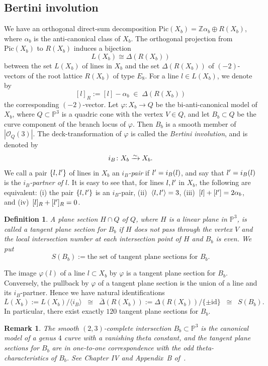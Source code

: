 \documentclass{math}
\theoremstyle{plain}
\newtheorem{definition}[theorem]{Definition}
\newtheorem{remark}[theorem]{Remark}
\numberwithin{equation}{section}
\newcommand{\PP}{\mathord{\mathbb  P}}
\newcommand{\ZZ}{\mathord{\mathbb Z}}
\newcommand{\OOO}{\mathord{\mathcal O}}
\newcommand{\isom}{\xrightarrow{\raise -3pt \hbox{\scriptsize $\sim$} }}
\newcommand{\angs}[1]{\langle {#1}  \rangle}
\newcommand{\sprime}{\sp{\prime}}
\newcommand{\id}{\mathord{\mathrm{id}}}
\newcommand{\intf}[1]{\langle #1 \rangle}
\newcommand{\Pic}{\mathrm{Pic}}
\newcommand{\barDelta}{\overline{\Delta}}
\newcommand{\barL}{\overline{L}}
\newcommand{\involB}{i_B}
\begin{document}
\subsection{Bertini involution}\label{subsec:Bertini}
%
We have an orthogonal direct-sum decomposition 
$\Pic(X_b)=\ZZ \alpha_b \oplus R(X_b)$,
where $\alpha_b$ is the anti-canonical class of $X_b$.
The orthogonal projection from $\Pic(X_b)$ to $R(X_b)$ induces a bijection 
%
\begin{equation}\label{eq:LX}
L(X_b)\cong  \Delta(R(X_b))
\end{equation}
%
between  the set $L(X_b)$ of lines in $X_b$ and  the set $\Delta(R(X_b))$
of $(-2)$-vectors of the root lattice $R(X_b)$ of type $E_8$.
For a line $l\in L(X_b)$, we denote by 
\[
[l]_R:=[l]-\alpha_b \;\in\; \Delta(R(X_b))
\]
the corresponding $(-2)$-vector. 
Let 
$\varphi\colon X_b\to Q$
be the bi-anti-canonical model of $X_b$,
where $Q\subset \PP^3$ is a   quadric cone with the vertex $V\in Q$,
and let $B_b\subset Q$ be the curve component of  the branch locus of 
$\varphi$.
Then  $B_b$ is a smooth member of $|\OOO_{Q}(3)|$. 
The deck-transformation of  $\varphi$
is called the \emph{Bertini involution},  and is denoted by
\[
\involB\colon X_b\isom X_b.
\]
We call a pair $\{l, l\sprime\}$ of lines in $X_b$ an \emph{$\involB$-pair}
if $l\sprime=\involB(l)$,
and say that $l\sprime=\involB(l)$ is the \emph{$\involB$-partner of $l$}.
It is easy to see that,
for lines $l, l\sprime$ in $X_b$,  the following are equivalent:
(i) the pair $\{l, l\sprime\}$ is an $\involB$-pair, 
(ii)~$\intf{l, l\sprime}=3$, 
(iii)~$[l]+[l\sprime]=2\alpha_b$, and
(iv)~$[l]_R+[l\sprime]_R=0$.
%
%
\begin{definition}\label{def:tps}
A plane section $H\cap Q$ of $Q$,
where $H$ is a linear plane in $\PP^3$,
is called a \emph{tangent plane section for $B_b$}
if $H$ does not pass through the vertex $V$ 
and the local intersection number at each intersection point 
of $H$ and $B_b$ is even.
We put
%
\[
S(B_b):=\textrm{the set of 
tangent plane sections  for $B_b$}.
\]
\end{definition}
%
The image $\varphi(l)$ of a line $l\subset X_b$
by $\varphi$ is a  tangent plane section for $B_b$.
Conversely, the pullback by $\varphi$ of a tangent plane section 
is the union of a line and its $\involB$-partner.
Hence we have natural identifications 
%
\begin{equation}\label{eq:barLX}
\barL(X_b):=L(X_b)/\angs{\involB}\;\;\cong\;\;  
\barDelta(R(X_b)):=\Delta(R(X_b))/\{\pm \id\} \;\;\cong\;\; S(B_b).
\end{equation}
%
In particular,
there exist
exactly $120$ tangent plane sections for $B_b$. 
%
%
\begin{remark}\label{rem:thetacharacteristics}
The smooth $(2,3)$-complete intersection  $B_b\subset \PP^3$
is the canonical model of a genus $4$ curve with a vanishing theta constant, and 
the tangent plane sections for $B_b$ are in one-to-one correspondence 
with the odd theta-characteristics of $B_b$.
See Chapter IV and Appendix~B of~\cite{ACGH1985}.
\end{remark}
%
%
%
\end{document}

